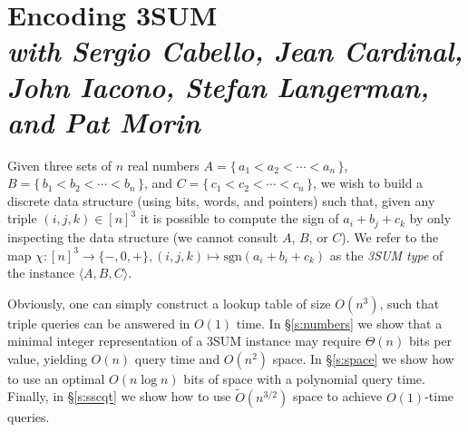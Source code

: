 \chapter%
[Encoding 3SUM]%
{Encoding 3SUM\\[1ex]
\normalfont\footnotesize\itshape with
Sergio Cabello,
Jean Cardinal,
John Iacono,
Stefan Langerman,
and
Pat Morin}%
\label{paper:3sum-encoding}

Given three sets of \(n\) real numbers
\(A = \{\, a_1 < a_2 < \cdots < a_n\,\} \),
\(B = \{\, b_1 < b_2 < \cdots < b_n\,\} \),
and \(C = \{\, c_1 < c_2 < \cdots < c_n\,\}\),
we wish to build a discrete data structure (using bits, words, and pointers) such that,
given any triple \((i,j,k) \in {[n]}^3\) it is possible to compute the sign of
\(a_i + b_j + c_k\) by only inspecting the data structure (we cannot consult
\(A\), \(B\), or \(C\)).
We refer to the map $\chi : {[n]}^3\to \{-,0,+\}, (i,j,k)\mapsto\mathrm{sgn}
(a_i+b_i+c_k)$ as the {\em 3SUM type} of the instance $\langle A,B,C \rangle$.

Obviously, one can simply construct a lookup table of size \(O(n^3)\), such
that triple queries can be answered in \(O(1)\) time.
%
In \S\ref{s:numbers} we show that a minimal integer representation of a
3SUM instance may require $\Theta(n)$ bits per value, yielding
$O(n)$ query time and $O(n^2)$ space.
%
In \S\ref{s:space} we show how to use an optimal $O(n \log n)$ bits of
space with a polynomial query time. Finally, in \S\ref{s:sscqt} we show
how to use $\tilde{O}(n^{3/2})$ space to achieve $O(1)$-time queries.


